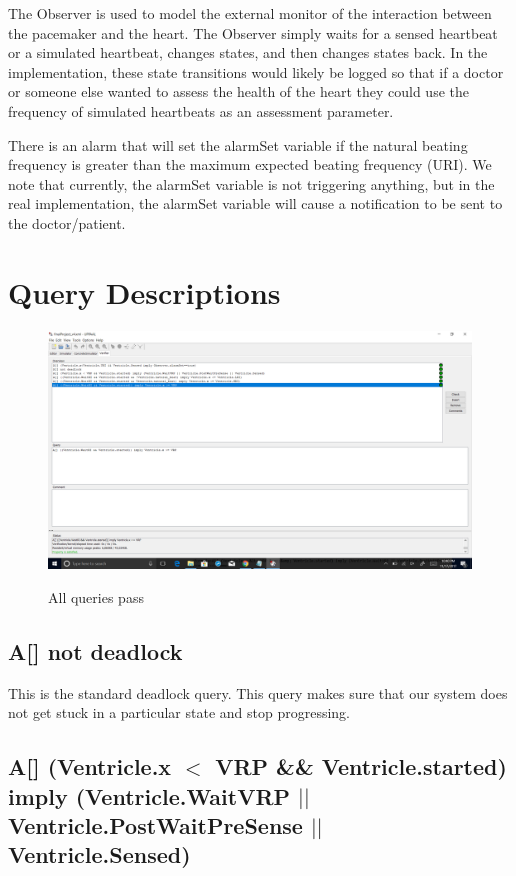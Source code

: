 \documentclass[10pt]{article}
\begin{document}
The Observer is used to model the external monitor of the interaction between the pacemaker and the heart. The Observer simply waits for a sensed heartbeat or a simulated heartbeat, changes states, and then changes states back. In the implementation, these state transitions would likely be logged so that if a doctor or someone else wanted to assess the health of the heart they could use the frequency of simulated heartbeats as an assessment parameter.

There is an alarm that will set the alarmSet variable if the natural beating frequency is greater than the maximum expected beating frequency (URI). We note that currently, the alarmSet variable is not triggering anything, but in the real implementation, the alarmSet variable will cause a notification to be sent to the doctor/patient.


\section{Query Descriptions}

	\begin{figure}[h]
		\includegraphics[scale=.4]{Properties_Snapshot.png}
		\label{Properties_Snapshot}
		\centering
		\caption{All queries pass}
	\end{figure}

	\subsection{A[] not deadlock}
		This is the standard deadlock query. This query makes sure that our system does not get stuck in a particular state and stop progressing.


	\subsection{A[] (Ventricle.x $<$ VRP \&\& Ventricle.started) imply (Ventricle.WaitVRP $||$ Ventricle.PostWaitPreSense $||$ Ventricle.Sensed)}
\end{document}
